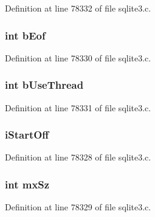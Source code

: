 Definition at line 78332 of file sqlite3.\+c.

\hypertarget{struct_incr_merger_a90d50c1a12552be88cb9a36b4458e337}{}
\subsubsection[{b\+Eof}]{\setlength{\rightskip}{0pt plus 5cm}int b\+Eof}\label{struct_incr_merger_a90d50c1a12552be88cb9a36b4458e337}


Definition at line 78330 of file sqlite3.\+c.

\hypertarget{struct_incr_merger_a8668e6d8e79cecf90b00fd10deef9fd3}{}
\subsubsection[{b\+Use\+Thread}]{\setlength{\rightskip}{0pt plus 5cm}int b\+Use\+Thread}\label{struct_incr_merger_a8668e6d8e79cecf90b00fd10deef9fd3}


Definition at line 78331 of file sqlite3.\+c.

\hypertarget{struct_incr_merger_aeb48c246fa5d7535b40c341d02ce4bc6}{}
\subsubsection[{i\+Start\+Off}]{ i\+Start\+Off}\label{struct_incr_merger_aeb48c246fa5d7535b40c341d02ce4bc6}


Definition at line 78328 of file sqlite3.\+c.

\hypertarget{struct_incr_merger_ad0f72137587b0e7ca896520d1b31c834}{}
\subsubsection[{mx\+Sz}]{\setlength{\rightskip}{0pt plus 5cm}int mx\+Sz}\label{struct_incr_merger_ad0f72137587b0e7ca896520d1b31c834}


Definition at line 78329 of file sqlite3.\+c.

\hypertarget{struct_incr_merger_ab9ebb5ec47cc445078cf9ffb98b9e66f}{}
